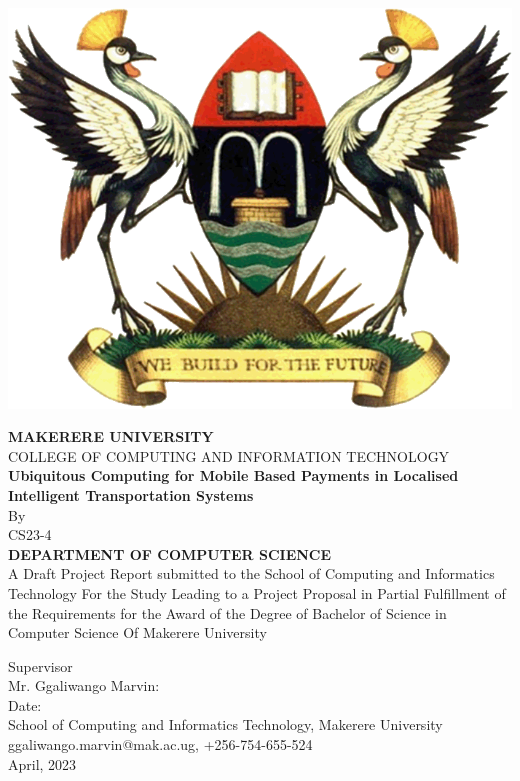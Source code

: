 \documentclass[11pt]{report}
\begin{document}
    \begin{titlepage}
        \begin{center}
            \includegraphics[scale=0.25]{images/muk}

            \textbf{MAKERERE UNIVERSITY}
            \\COLLEGE OF COMPUTING AND INFORMATION TECHNOLOGY
            \vspace{1cm}
            \\{\textbf{ Ubiquitous Computing for Mobile Based Payments in Localised Intelligent Transportation Systems}}
            \vspace{0.5cm}
            \\By
            \\CS23-4
            \vspace{0.5cm}
            \\{\textbf{
                DEPARTMENT OF COMPUTER SCIENCE
            }}
            \vspace{0.5cm}
            \\A Draft Project Report submitted to the School of Computing and Informatics Technology
            For the Study Leading to a Project Proposal in Partial Fulfillment of the
            Requirements for the Award of the Degree of Bachelor of Science in Computer Science
            Of Makerere University
            \vspace{0.5cm}

            Supervisor
            \vspace{0.2cm}
            \\Mr. Ggaliwango Marvin:\dotfill
            \vspace{0.2cm}
            \\Date:\dotfill
            \vspace{0.2cm}
            \\School of Computing and Informatics Technology, Makerere University
            \\ggaliwango.marvin@mak.ac.ug, +256-754-655-524
            \\April, 2023
        \end{center}
    \end{titlepage}
\end{document}
